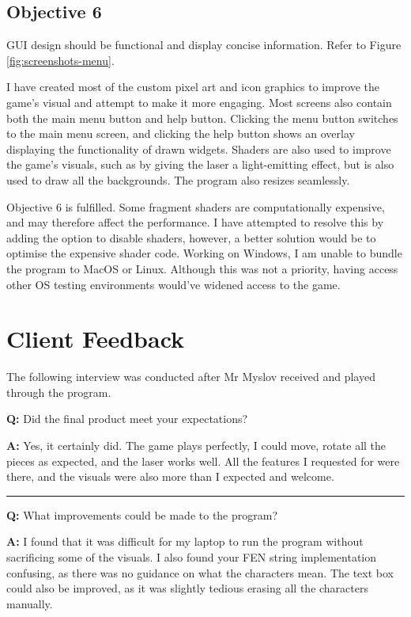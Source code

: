 \documentclass[../main/main.tex]{subfiles}
\begin{document}
\subsection{Objective 6}
GUI design should be functional and display concise information. Refer to Figure \ref{fig:screenshots-menu}.

I have created most of the custom pixel art and icon graphics to improve the game's visual and attempt to make it more engaging. Most screens also contain both the main menu button and help button. Clicking the menu button switches to the main menu screen, and clicking the help button shows an overlay displaying the functionality of drawn widgets. Shaders are also used to improve the game's visuals, such as by giving the laser a light-emitting effect, but is also used to draw all the backgrounds. The program also resizes seamlessly.

Objective 6 is fulfilled. Some fragment shaders are computationally expensive, and may therefore affect the performance. I have attempted to resolve this by adding the option to disable shaders, however, a better solution would be to optimise the expensive shader code. Working on Windows, I am unable to bundle the program to MacOS or Linux. Although this was not a priority, having access other OS testing environments would've widened access to the game.

\section{Client Feedback}
The following interview was conducted after Mr Myslov received and played through the program.

\bigskip

\noindent\textbf{Q:} Did the final product meet your expectations?

\noindent\textbf{A:} Yes, it certainly did. The game plays perfectly, I could move, rotate all the pieces as expected, and the laser works well. All the features I requested for were there, and the visuals were also more than I expected and welcome.

\noindent\rule{\textwidth}{0.4pt}

\noindent\textbf{Q:} What improvements could be made to the program?

\noindent\textbf{A:} I found that it was difficult for my laptop to run the program without sacrificing some of the visuals. I also found your FEN string implementation confusing, as there was no guidance on what the characters mean. The text box could also be improved, as it was slightly tedious erasing all the characters manually.
\end{document}
